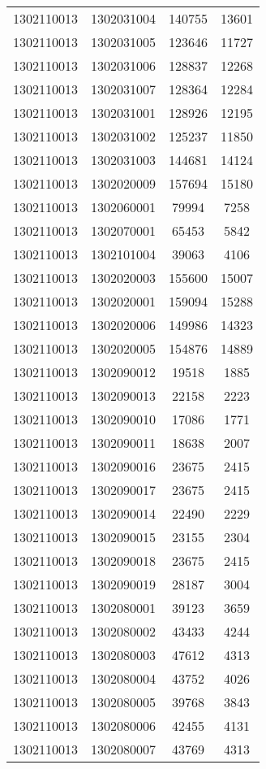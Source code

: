 \begin{longtable}[h]{llcc}
		1302110013 & 1302031004 & 140755 & 13601\\
		1302110013 & 1302031005 & 123646 & 11727\\
		1302110013 & 1302031006 & 128837 & 12268\\
		1302110013 & 1302031007 & 128364 & 12284\\
		1302110013 & 1302031001 & 128926 & 12195\\
		1302110013 & 1302031002 & 125237 & 11850\\
		1302110013 & 1302031003 & 144681 & 14124\\
		1302110013 & 1302020009 & 157694 & 15180\\
		1302110013 & 1302060001 & 79994 & 7258\\
		1302110013 & 1302070001 & 65453 & 5842\\
		1302110013 & 1302101004 & 39063 & 4106\\
		1302110013 & 1302020003 & 155600 & 15007\\
		1302110013 & 1302020001 & 159094 & 15288\\
		1302110013 & 1302020006 & 149986 & 14323\\
		1302110013 & 1302020005 & 154876 & 14889\\
		1302110013 & 1302090012 & 19518 & 1885\\
		1302110013 & 1302090013 & 22158 & 2223\\
		1302110013 & 1302090010 & 17086 & 1771\\
		1302110013 & 1302090011 & 18638 & 2007\\
		1302110013 & 1302090016 & 23675 & 2415\\
		1302110013 & 1302090017 & 23675 & 2415\\
		1302110013 & 1302090014 & 22490 & 2229\\
		1302110013 & 1302090015 & 23155 & 2304\\
		1302110013 & 1302090018 & 23675 & 2415\\
		1302110013 & 1302090019 & 28187 & 3004\\
		1302110013 & 1302080001 & 39123 & 3659\\
		1302110013 & 1302080002 & 43433 & 4244\\
		1302110013 & 1302080003 & 47612 & 4313\\
		1302110013 & 1302080004 & 43752 & 4026\\
		1302110013 & 1302080005 & 39768 & 3843\\
		1302110013 & 1302080006 & 42455 & 4131\\
		1302110013 & 1302080007 & 43769 & 4313\\

\end{longtable}
